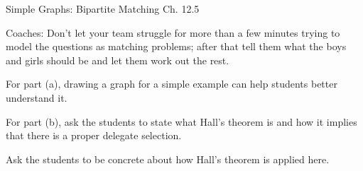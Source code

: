 \documentclass[handout]{mcs}
\begin{document}

\begin{staffnotes}
Simple Graphs: Bipartite Matching Ch. 12.5

Coaches: Don't let your team struggle for more than a few minutes
trying to model the questions as matching problems; after that tell
them what the boys and girls should be and let them work out the rest.
\end{staffnotes}

\begin{staffnotes}
For part (a), drawing a graph for a simple example can help students better understand it.

For part (b), ask the students to state what Hall's theorem is and how it implies that there is a proper delegate selection.
\end{staffnotes}


\begin{staffnotes}
Ask the students to be concrete about how Hall's theorem is applied here.
\end{staffnotes}




\end{document}
